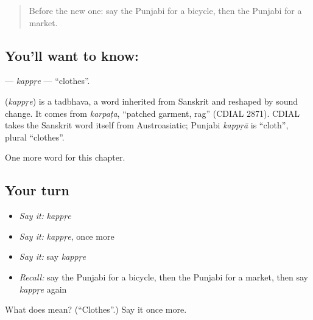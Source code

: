 \begin{quote}
Before the new one: say the Punjabi for a bicycle, then the Punjabi for a market.
\end{quote}

\subsection*{You'll want to know: }
\textbf{} — \emph{kappṛe} — \textquotedblleft{}clothes\textquotedblright{}.

\begin{cousinweb}
\textbf{} (\emph{kappṛe}) is a tadbhava, a word inherited from Sanskrit and reshaped by sound change. It comes from \emph{karpaṭa}, \textquotedblleft{}patched garment, rag\textquotedblright{} (CDIAL 2871). CDIAL takes the Sanskrit word itself from Austroasiatic; Punjabi \emph{kappṛā} is \textquotedblleft{}cloth\textquotedblright{}, plural \textquotedblleft{}clothes\textquotedblright{}.
\end{cousinweb}

\begin{grammarlens}[title={What you've built}]
One more word for this chapter.
\end{grammarlens}

\subsection*{Your turn}
\begin{itemize}
\raggedright
  \item \emph{Say it:} \emph{kappṛe}
  \item \emph{Say it:} \emph{kappṛe}, once more
  \item \emph{Say it:} say \emph{kappṛe}
  \item \emph{Recall:} say the Punjabi for a bicycle, then the Punjabi for a market, then say \emph{kappṛe} again
\end{itemize}

\begin{tcolorbox}[breakable,colback=teal!4,colframe=teal!35!black,title={Before you move on}]
What does  mean? (\textquotedblleft{}Clothes\textquotedblright{}.) Say it once more.
\end{tcolorbox}
